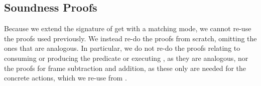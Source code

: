 
\subsection{Soundness Proofs}

Because we extend the signature of get with a matching mode, we cannot re-use the proofs used previously. We instead re-do the proofs from scratch, omitting the ones that are analogous. In particular, we do not re-do the proofs relating to consuming or producing the \domainset{} predicate or executing \alloc{}, as they are analogous, nor the proofs for frame subtraction and addition, as these only are needed for the concrete actions, which we re-use from \PMap.

